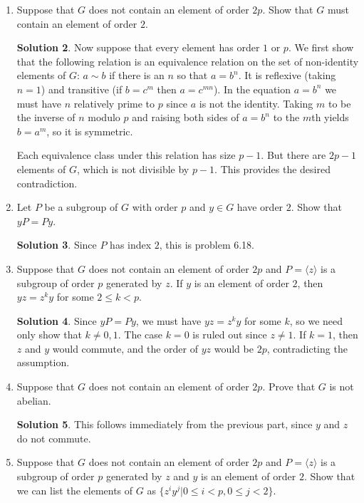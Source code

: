 \documentclass{article}
\theoremstyle{definition}
\newtheorem*{solution}{Solution}
\begin{document}
\begin{enumerate}
\begin{enumerate}
\begin{solution}
\end{solution}
\item Suppose that $G$ does not contain an element of order $2p$. Show that $G$ must contain an element of order $2$.
\begin{solution}
Now suppose that every element has order $1$ or $p$.  We first show that the following relation is an equivalence relation on the set of non-identity elements of $G$: $a \sim b$ if there is an $n$ so that $a = b^n$.  It is reflexive (taking $n=1$) and transitive (if $b = c^m$ then $a = c^{mn}$).  In the equation $a=b^n$ we must have $n$ relatively prime to $p$ since $a$ is not the identity.  Taking $m$ to be the inverse of $n$ modulo $p$ and raising both sides of $a = b^n$ to the $m$th yields $b = a^m$, so it is symmetric.

Each equivalence class under this relation has size $p-1$.  But there are $2p-1$ elements of $G$, which is not divisible by $p-1$.  This provides the desired contradiction.
\end{solution}
\item Let $P$ be a subgroup of $G$ with order $p$ and $y \in G$ have order $2$.  Show that $yP =Py$.
\begin{solution}
Since $P$ has index $2$, this is problem 6.18.
\end{solution}
\item Suppose that $G$ does not contain an element of order $2p$ and $P = \langle z \rangle$ is a subgroup of order $p$ generated by $z$. If $y$ is an element of order $2$, then $yz=z^ky$ for some $2 \le k < p$.
\begin{solution}
Since $yP = Py$, we must have $yz = z^ky$ for some $k$, so we need only show that $k \ne 0, 1$.  The case $k=0$ is ruled out since $z \ne 1$.  If $k=1$, then $z$ and $y$ would commute, and the order of $yz$ would be $2p$, contradicting the assumption.
\end{solution}
\item Suppose that $G$ does not contain an element of order $2p$. Prove that $G$ is not abelian.
\begin{solution}
This follows immediately from the previous part, since $y$ and $z$ do not commute.
\end{solution}
\item Suppose that $G$ does not contain an element of order $2p$ and $P = \langle z \rangle$ is a subgroup of order $p$ generated by $z$ and $y$ is an element of order $2$. Show that we can list the elements of $G$ as $\{z^iy^j | 0 \le i < p, 0 \le j < 2\}$.

\end{enumerate}
\end{enumerate}
\end{document}
